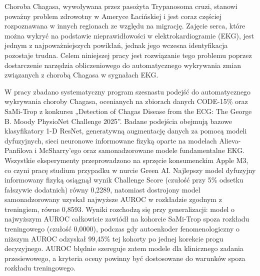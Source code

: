 \documentclass[english]{agh-wi}     %
\author{Juliusz Antoni Wasieleski}
\begin{document}
\frontmatter %
\maketitle %
\begin{abstractPL}
    Choroba Chagasa, wywoływana przez pasożyta Trypanosoma cruzi, stanowi poważny problem zdrowotny w Ameryce Łacińskiej i jest coraz częściej rozpoznawana w innych regionach ze względu na migrację. Zajęcie serca, które można wykryć na podstawie nieprawidłowości w elektrokardiogramie (EKG), jest jednym z najpoważniejszych powikłań, jednak jego wczesna identyfikacja pozostaje trudna. Celem niniejszej pracy jest rozwiązanie tego problemu poprzez dostarczenie narzędzia obliczeniowego do automatycznego wykrywania zmian związanych z chorobą Chagasa w sygnałach EKG.

W pracy zbadano systematyczny program szesnastu podejść do automatycznego wykrywania choroby Chagasa, ocenianych na zbiorach danych CODE-15\% oraz SaMi-Trop z konkursu „Detection of Chagas Disease from the ECG: The George B. Moody PhysioNet Challenge 2025”. Badane podejścia obejmują bazowe klasyfikatory 1-D ResNet, generatywną augmentację danych za pomocą modeli dyfuzyjnych, sieci neuronowe informowane fizyką oparte na modelach Alieva-Panfilova i McSharry'ego oraz samonadzorowane modele fundamentalne EKG. Wszystkie eksperymenty przeprowadzono na sprzęcie konsumenckim Apple M3, co czyni pracę studium przypadku w nurcie Green AI.
Najlepszy model dyfuzyjny informowany fizyką osiągnął wynik Challenge Score (czułość przy 5\% odsetku fałszywie dodatnich) równy 0,2289, natomiast dostrojony model samonadzorowany uzyskał najwyższe AUROC w rozkładzie zgodnym z treningiem, równe 0,8593. Wyniki rozchodzą się przy generalizacji: model o najwyższym AUROC całkowicie zawiódł na kohorcie SaMi-Trop spoza rozkładu treningowego (czułość 0,0000), podczas gdy autoenkoder fenomenologiczny o niższym AUROC odzyskał 99,45\% tej kohorty po jednej korekcie progu decyzyjnego. AUROC błędnie szereguje zatem modele dla klinicznego zadania przesiewowego, a kryteria oceny powinny być dostosowane do warunków spoza rozkładu treningowego.
\end{abstractPL}
\end{document}

